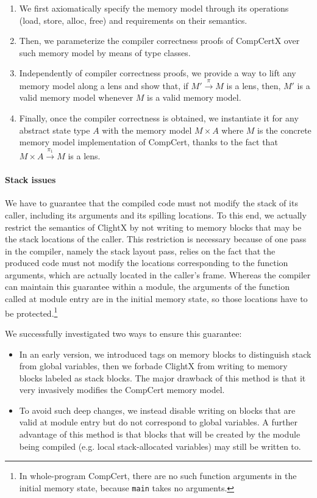 \begin{enumerate}
\item We first axiomatically specify the memory model through its
  operations (load, store, alloc, free) and requirements on their
  semantics.
\item Then, we parameterize the compiler correctness proofs of
  CompCertX over such memory model by means of type classes.
\item Independently of compiler correctness proofs, we provide a
  way to lift any memory model along a lens and show that, if $M'
  \stackrel{\pi}{\longrightarrow} M$ is a lens, then, $M'$ is a valid
  memory model whenever $M$ is a valid memory model.
\item Finally, once the compiler correctness is obtained, we
  instantiate it for any abstract state type $A$ with the memory model $M \times A$
  where $M$ is the concrete memory model implementation of CompCert,
  thanks to the fact that $M \times A
  \stackrel{\pi_1}{\longrightarrow} M$ is a lens.
\end{enumerate}


\paragraph{Stack issues} 
We have to guarantee that the compiled code must not modify the stack
of its caller, including its arguments and its spilling locations. To
this end, we actually restrict the semantics of ClightX by not writing
to memory blocks that may be the stack locations of the caller.  This
restriction is necessary because of one pass in the compiler, namely the
stack layout pass, relies on the fact that the produced code must not
modify the locations corresponding to the function arguments, which
are actually located in the caller's frame. Whereas the compiler
can maintain this guarantee within a module, the arguments of the
function called at module entry are in the initial memory state, so
those locations have to be protected.\footnote{In whole-program
  CompCert, there are no such function arguments in the initial memory
  state, because \texttt{main} takes no arguments.}

We successfully investigated two ways to ensure this guarantee:
\begin{itemize}
\item In an early version, we introduced tags on memory blocks to
  distinguish stack from global variables, then we forbade ClightX
  from writing to memory blocks labeled as stack blocks. The major
  drawback of this method is that it very invasively modifies the
  CompCert memory model.
\item To avoid such deep changes, we instead disable writing on blocks
  that are valid at module entry but do not correspond to global
  variables. A further advantage of this method is that blocks that will be
  created by the module being compiled (e.g. local stack-allocated
  variables) may still be written to.
\end{itemize}



